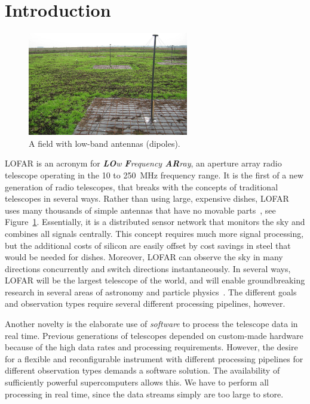 \documentclass{sig-alternate}
\begin{document}
\section{Introduction}

\begin{figure}[t]
\begin{center}
\includegraphics[width=70mm]{LBA-field.jpg}
\end{center}
\caption{A field with low-band antennas (dipoles).}
\label{fig:lba-field}
\end{figure}

LOFAR is an acronym for \emph{\textbf{LO}w \textbf{F}requency \textbf{AR}ray},
an aperture array radio telescope operating in the 10 to 250~MHz frequency
range.
It is the first of a new generation of radio telescopes, that breaks with
the concepts of traditional telescopes in several ways.
Rather than using large, expensive dishes, LOFAR uses many thousands of
simple antennas that have no movable parts~\cite{Butcher:04,deVos:09}, see Figure~\ref{fig:lba-field}.
Essentially, it is a distributed sensor network that monitors the sky
and combines all signals centrally.
This concept requires much more signal processing, but the additional costs
of silicon are easily offset by cost savings in steel that would be needed for dishes.
Moreover, LOFAR can observe the sky in many directions concurrently and
switch directions instantaneously. 
In several ways, LOFAR will be the largest telescope of the world, 
and will enable groundbreaking research in several areas of astronomy and particle
physics~\cite{Bruyn:02}. The different goals and observation types require
several different processing pipelines, however.

Another novelty is the elaborate use of \emph{software\/} to process
the telescope data in real time. 
Previous generations of telescopes depended on custom-made hardware
because of the high data rates and processing requirements.
However, the desire for a flexible and reconfigurable instrument with
different processing pipelines for different observation types demands a
software solution.
The availability of sufficiently powerful supercomputers allows this.
We have to perform all processing in real time,
since the data streams simply are too large to store.
\end{document}
